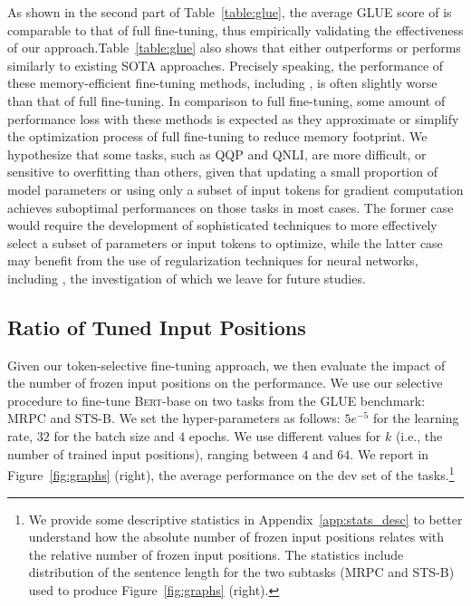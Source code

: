 As shown in the second part of Table~\ref{table:glue}, the average GLUE score of \method is comparable to that of full fine-tuning, thus empirically validating the effectiveness of our approach.Table~\ref{table:glue} also shows that \method either outperforms or performs similarly to existing SOTA approaches.
Precisely speaking, the performance of these memory-efficient fine-tuning methods, including \method, is often slightly worse than that of full fine-tuning.
In comparison to full fine-tuning, some amount of performance loss with these methods is expected as 
they approximate or simplify the optimization process of full fine-tuning to reduce memory footprint.
We hypothesize that some tasks, such as QQP and QNLI, are more difficult, or sensitive to overfitting than others,
given that updating a small proportion of model parameters or using only a subset of input tokens for gradient computation 
achieves suboptimal performances on those tasks in most cases.
The former case would require the development of sophisticated techniques to more effectively select a subset of parameters or input tokens to optimize,
while the latter case may benefit from the use of regularization techniques for neural networks, including \citet{DBLP:conf/iclr/GoukHP21,DBLP:conf/iclr/ForetKMN21,DBLP:conf/nips/LiZ21},
the investigation of which we leave for future studies.



\subsection{Ratio of Tuned Input Positions} \label{sec:medium:ratio}

Given our token-selective fine-tuning approach, we then evaluate the impact of the number of frozen input positions on the performance. We use our selective procedure to fine-tune \textsc{Bert}-base on two tasks from the GLUE benchmark: MRPC and STS-B. 
We set the hyper-parameters as follows: $5e^{-5}$ for the learning rate, $32$ for the batch size and $4$ epochs.
We use different values for $k$ (i.e., the number of trained input positions), ranging between $4$ and $64$. We report in Figure~\ref{fig:graphs} (right), the average performance on the dev set of the tasks.\footnote{We provide some descriptive statistics in Appendix~\ref{app:stats_desc} to better understand how the absolute number of frozen input positions relates with the relative number of frozen input positions. The statistics include distribution of the sentence length for the two subtasks (MRPC and STS-B) used to produce Figure~\ref{fig:graphs} (right).}

